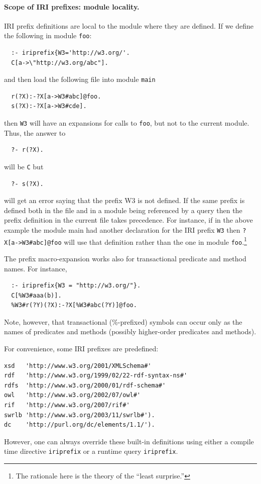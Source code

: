 \documentclass[11pt]{article}
\begin{document}
\paragraph{Scope of IRI prefixes: module locality.}
IRI prefix definitions are local to the module where they are
defined. If we define the following in module {\tt foo}:
\begin{verbatim}
  :- iriprefix{W3='http://w3.org/'.
  C[a->\"http://w3.org/abc"].
\end{verbatim}
and then load the following file into module {\tt main} 
\begin{verbatim}
  r(?X):-?X[a->W3#abc]@foo.
  s(?X):-?X[a->W3#cde].
\end{verbatim}
then  {\tt W3} will have an expansions for calls to \texttt{foo}, but not
to the current module. 
Thus, the answer to
\begin{verbatim}
  ?- r(?X).
\end{verbatim}
will be {\tt C} but
\begin{verbatim}
  ?- s(?X).
\end{verbatim}
will get an error saying that the prefix W3 is not defined.
If the same prefix is defined both in the file and in a module being
referenced by a query then the prefix definition in the current file takes
precedence.
For instance, if in the above example the module main had another
declaration for the IRI prefix \texttt{W3} then \texttt{?X[a->W3\#abc]@foo}
will use that definition rather than the one in module
\texttt{foo}.\footnote{
  The rationale here is the theory of the ``least surprise.''
}

The prefix macro-expansion works also for transactional predicate and
method names. For instance,
\begin{verbatim}
  :- iriprefix{W3 = "http://w3.org/"}.
  C[%W3#aaa(b)].
  %W3#r(?Y)(?X):-?X[%W3#abc(?Y)]@foo.
\end{verbatim}
Note, however, that transactional (\%-prefixed) symbols can occur
only as the names of predicates and methods (possibly higher-order
predicates and methods).

For convenience, some IRI prefixes are predefined:
\begin{verbatim}
xsd   'http://www.w3.org/2001/XMLSchema#'
rdf   'http://www.w3.org/1999/02/22-rdf-syntax-ns#'
rdfs  'http://www.w3.org/2000/01/rdf-schema#'
owl   'http://www.w3.org/2002/07/owl#'
rif   'http://www.w3.org/2007/rif#'
swrlb 'http://www.w3.org/2003/11/swrlb#').
dc    'http://purl.org/dc/elements/1.1/').
\end{verbatim}
However, one can always override these built-in definitions using either a
compile time directive {\tt iriprefix} or a runtime query {\tt iriprefix}.
\end{document}
